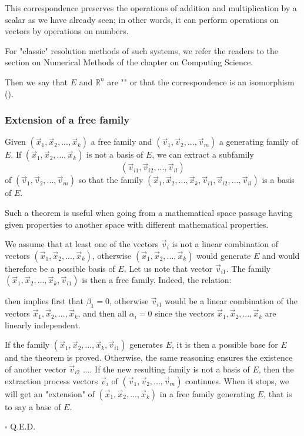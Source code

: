 	This correspondence preserves the operations of addition and multiplication by a scalar as we have already seen; in other words, it can perform operations on vectors by operations on numbers.
	
	\begin{tcolorbox}[title=Remark,colframe=black,arc=10pt]
For "classic" resolution methods of such systems, we refer the readers to the section on Numerical Methods of the chapter on Computing Science.
	\end{tcolorbox}	
	Then we say that $E$ and $\mathbb{R}^n$ are "" or that the correspondence is an isomorphism ().
	
	\subsubsection{Extension of a free family}
	\begin{theorem}
	Given $(\vec{x}_1,\vec{x}_2,...,\vec{x}_k)$ a free family and $(\vec{v}_1,\vec{v}_2,...,\vec{v}_m)$ a generating family of $E$. If $(\vec{x}_1,\vec{x}_2,...,\vec{x}_k)$ is not a basis of $E$, we can extract a subfamily $$(\vec{v}_{i1},\vec{v}_{i2},...,\vec{v}_{il})$$ of $(\vec{v}_1,\vec{v}_2,...,\vec{v}_m)$ so that the family $(\vec{x}_1,\vec{x}_2,...,\vec{x}_k,\vec{v}_{i1},\vec{v}_{i2},...,\vec{v}_{il})$ is a basis of $E$.
	\end{theorem}
	\begin{tcolorbox}[title=Remark,colframe=black,arc=10pt]
	Such a theorem is useful when going from a mathematical space passage having given properties to another space with different mathematical properties.
	\end{tcolorbox}	
	\begin{dem}
	We assume that at least one of the vectors $\vec{v}_i$ is not a linear combination of vectors $(\vec{x}_1,\vec{x}_2,...,\vec{x}_k)$, otherwise $(\vec{x}_1,\vec{x}_2,...,\vec{x}_k)$ would generate $E$ and would therefore be a possible basis of $E$. Let us note that vector $\vec{v}_{i1}$. The family $(\vec{x}_1,\vec{x}_2,...,\vec{x}_k,\vec{v}_{i1})$ is then a free family. Indeed, the relation:
	
	then implies first that $\beta_1=0$, otherwise $\vec{v}_{i1}$ would be a linear combination of the vectors $\vec{x}_1,\vec{x}_2,...,\vec{x}_k$, and then all $\alpha_i=0$ since the vectors $\vec{x}_1,\vec{x}_2,...,\vec{x}_k$ are linearly independent.
	
	If the family $(\vec{x}_1,\vec{x}_2,...,\vec{x}_k,\vec{v}_{i1})$ generates $E$, it is then a possible base for $E$ and the theorem is proved. Otherwise, the same reasoning ensures the existence of another vector $\vec{v}_{i2}$ .... If the new resulting family is not a basis of $E$, then the extraction process vectors $\vec{v}_i$ of $(\vec{v}_1,\vec{v}_2,...,\vec{v}_m)$ continues. When it stops, we will get an "extension" of $(\vec{x}_1,\vec{x}_2,...,\vec{x}_k)$ in a free family generating $E$, that is to say a base of $E$.
	\begin{flushright}
		$\square$  Q.E.D.
	\end{flushright}
	\end{dem}
